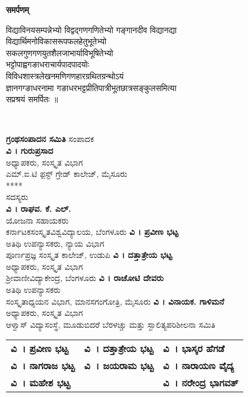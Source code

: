 \begin{mdframed}[roundcorner=10pt]
\phantom{i}
\medskip
{}
\centering
{\fontsize{15}{17}\selectfont
{\Large\bfseries समर्पणम्}
\bigskip

विद्याविनयसम्पन्नेभ्यो विद्वद्गणगणितेभ्यो गङ्गानदीव विद्यानद्या\\
विद्यार्थिमनोविकासरूपफलहेतुभूतेभ्यो \\
सकलगुणगणयुतशैलजाभार्याविभूषितेभ्यो\\   
भट्टोपाह्वगङाधराचार्यपादपादयोः \\
विविधशास्त्रलेखनमणिगणहारग्रथितग्रन्थोऽयं\\
ज्ञानगग्ङाधरनामा गङाधरभट्टप्रीतिपात्रीभूतछात्रसङ्कुलसमित्या\\
सप्रश्रयं समर्पितः ॥}
\bigskip
\phantom{i}
\end{mdframed}
\newpage
~\thispagestyle{empty}
\newpage
\vfill
\eject
\thispagestyle{empty}
\begin{center}
{\huge\bfseries ಗ್ರಂಥಸಂಪಾದನ ಸಮಿತಿ}
\vfill
{\Large ಸಂಪಾದಕ}\\
{\Large\bfseries ವಿ । ಗುರುಪ್ರಸಾದ}\\
ಅಧ್ಯಾಪಕರು, ಸಂಸ್ಕೃತ ವಿಭಾಗ\\
ಎಮ್.ಐ.ಟಿ ಫ಼ಸ್ಟ್ ಗ್ರೇಡ್ ಕಾಲೇಜ್, ಮೈಸೂರು  \\
****\\
\vfill
{\large ಸದಸ್ಯರು}\\
{\large\bfseries ವಿ । ರಾಘವ. ಕೆ. ಎಲ್.}\\
ಯೋಜನಾ ಸಹಾಯಕರು\\
ಕರ್ನಾಟಕಸಂಸ್ಕೃತವಿಶ್ವವಿದ್ಯಾಲಯ, ಬೆಂಗಳೂರು
\vfill
{\large\bfseries ವಿ । ಪ್ರವೀಣ ಭಟ್ಟ}\\
ಅತಿಥಿ ಉಪನ್ಯಾಸಕರು, ನ್ಯಾಯ ವಿಭಾಗ\\
ಪೂರ್ಣಪ್ರಜ್ಞ ಸಂಸ್ಕೃತ ಕಾಲೇಜ್, ಉಡುಪಿ
\vfill
{\large\bfseries ವಿ । ದತ್ತಾತ್ರೇಯ ಭಟ್ಟ}\\
ಅಧ್ಯಾಪಕರು, ಸಂಸ್ಕೃತ ವಿಭಾಗ\\
ಶ್ರೀವಾಣೀವಿದ್ಯಾಕೇಂದ್ರ, ಬೆಂಗಳೂರು
\vfill
{\large\bfseries ವಿ । ರಾಚೋಟಿ ದೇವರು}\\
ಅತಿಥಿ ಉಪನ್ಯಾಸಕರು\\
ಸಂಸ್ಕೃತಾಧ್ಯಯನ ವಿಭಾಗ, ಮಾನಸಗಂಗೋತ್ರಿ, ಮೈಸೂರು
\vfill
{\large\bfseries ವಿ । ವಿನಾಯಕ. ಗಾಳಿಮನೆ}\\
ಅಧ್ಯಾಪಕರು, ಸಂಸ್ಕೃತ ವಿಭಾಗ\\
ಆಳ್ವಾಸ್ ವಿದ್ಯಾಸಂಸ್ಥೆ, ಮೂಡುಬಿದರೆ
\vfill
{\large ಬೆರಳಚ್ಚು ಮತ್ತು ಸ್ಖಾಲಿತ್ಯಪರಿಶೀಲನಾ ಸಮಿತಿ}\\[4pt]
\begin{tabular}{@{}lll@{}}
{\bfseries ವಿ~। ಪ್ರವೀಣ ಭಟ್ಟ} & {\bfseries ವಿ~। ದತ್ತಾತ್ರೇಯ ಭಟ್ಟ}  &{\bfseries ವಿ~। ಭಾಸ್ಕರ ಹೆಗಡೆ}\\			
{\bfseries ವಿ~। ನಾಗರಾಜ ಭಟ್ಟ} &{\bfseries ವಿ~। ಜಯರಾಮ ಭಟ್ಟ} &{\bfseries  ವಿ~। ನಾರಾಯಣ ವೈದ್ಯ} \\
{\bfseries ವಿ~। ಮಹೇಶ ಭಟ್ಟ} & & {\bfseries ವಿ~। ನರೇಂದ್ರ ಭಾಗವತ್}
\end{tabular}
\end{center}

